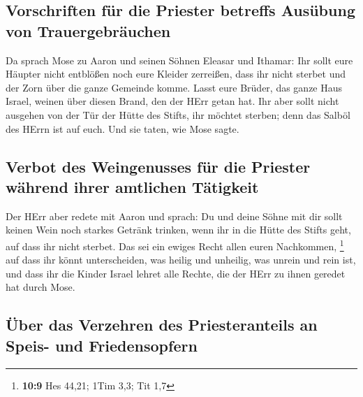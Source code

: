 \hypertarget{vorschriften-fuxfcr-die-priester-betreffs-ausuxfcbung-von-trauergebruxe4uchen}{%
\subsection{Vorschriften für die Priester betreffs Ausübung von
Trauergebräuchen}\label{vorschriften-fuxfcr-die-priester-betreffs-ausuxfcbung-von-trauergebruxe4uchen}}

 Da sprach Mose zu Aaron und seinen Söhnen Eleasar und
Ithamar: Ihr sollt eure Häupter nicht entblößen noch eure Kleider
zerreißen, dass ihr nicht sterbet und der Zorn über die ganze Gemeinde
komme. Lasst eure Brüder, das ganze Haus Israel, weinen über diesen
Brand, den der HErr getan hat.  Ihr aber sollt nicht
ausgehen von der Tür der Hütte des Stifts, ihr möchtet sterben; denn das
Salböl des HErrn ist auf euch. Und sie taten, wie Mose sagte.

\hypertarget{verbot-des-weingenusses-fuxfcr-die-priester-wuxe4hrend-ihrer-amtlichen-tuxe4tigkeit}{%
\subsection{Verbot des Weingenusses für die Priester während ihrer
amtlichen
Tätigkeit}\label{verbot-des-weingenusses-fuxfcr-die-priester-wuxe4hrend-ihrer-amtlichen-tuxe4tigkeit}}

 Der HErr aber redete mit Aaron und sprach: 
Du und deine Söhne mit dir sollt keinen Wein noch starkes Getränk
trinken, wenn ihr in die Hütte des Stifts geht, auf dass ihr nicht
sterbet. Das sei ein ewiges Recht allen euren Nachkommen, \footnote{\textbf{10:9}
  Hes 44,21; 1Tim 3,3; Tit 1,7}  auf dass ihr könnt
unterscheiden, was heilig und unheilig, was unrein und rein ist,
 und dass ihr die Kinder Israel lehret alle Rechte, die
der HErr zu ihnen geredet hat durch Mose.

\hypertarget{uxfcber-das-verzehren-des-priesteranteils-an-speis--und-friedensopfern}{%
\subsection{Über das Verzehren des Priesteranteils an Speis- und
Friedensopfern}\label{uxfcber-das-verzehren-des-priesteranteils-an-speis--und-friedensopfern}}

